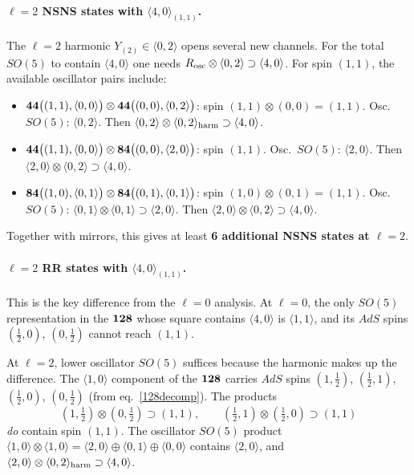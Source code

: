 \documentclass[12pt]{article}
\def\be{\begin{equation}}
\def\ee{\end{equation}}
\begin{document}
\paragraph{$\ell=2$ NSNS states with $\langle 4,0\rangle_{(1,1)}$.}
The $\ell=2$ harmonic $Y_{(2)}\in\langle 0,2\rangle$ opens several new channels.
For the total $SO(5)$ to contain $\langle 4,0\rangle$ one needs
$R_{\rm osc}\otimes\langle 0,2\rangle\supset\langle 4,0\rangle$.
For spin $(1,1)$, the available oscillator pairs include:
\begin{itemize}
\item ${\bf 44}\big((1,1),\langle 0,0\rangle\big)\otimes{\bf 44}\big((0,0),\langle 0,2\rangle\big)$:
spin $(1,1)\otimes(0,0)=(1,1)$. Osc.\ $SO(5)$: $\langle 0,2\rangle$.
Then $\langle 0,2\rangle\otimes\langle 0,2\rangle_{\rm harm}\supset\langle 4,0\rangle$. \checkmark
\item ${\bf 44}\big((1,1),\langle 0,0\rangle\big)\otimes{\bf 84}\big((0,0),\langle 2,0\rangle\big)$:
spin $(1,1)$. Osc.\ $SO(5)$: $\langle 2,0\rangle$.
Then $\langle 2,0\rangle\otimes\langle 0,2\rangle\supset\langle 4,0\rangle$. \checkmark
\item ${\bf 84}\big((1,0),\langle 0,1\rangle\big)\otimes{\bf 84}\big((0,1),\langle 0,1\rangle\big)$:
spin $(1,0)\otimes(0,1)=(1,1)$. Osc.\ $SO(5)$:
$\langle 0,1\rangle\otimes\langle 0,1\rangle\supset\langle 2,0\rangle$.
Then $\langle 2,0\rangle\otimes\langle 0,2\rangle\supset\langle 4,0\rangle$. \checkmark
\end{itemize}
Together with mirrors, this gives at least \textbf{6 additional NSNS states at $\ell=2$}.

\paragraph{$\ell=2$ RR states with $\langle 4,0\rangle_{(1,1)}$.}
This is the key difference from the $\ell=0$ analysis.
At $\ell=0$, the only $SO(5)$ representation in the ${\bf 128}$ whose square contains
$\langle 4,0\rangle$ is $\langle 1,1\rangle$, and its $AdS$ spins
$(\tfrac12,0)$, $(0,\tfrac12)$ cannot reach $(1,1)$.

At $\ell=2$, lower oscillator $SO(5)$ suffices because the harmonic makes up the difference.
The $\langle 1,0\rangle$ component of the ${\bf 128}$ carries $AdS$ spins
$(1,\tfrac12)$, $(\tfrac12,1)$, $(\tfrac12,0)$, $(0,\tfrac12)$
(from eq.~\eqref{128decomp}). The products
\be
(1,\tfrac12)\otimes(0,\tfrac12)
\supset(1,1),
\qquad
(\tfrac12,1)\otimes(\tfrac12,0)
\supset(1,1)
\ee
\emph{do} contain spin $(1,1)$.
The oscillator $SO(5)$ product $\langle 1,0\rangle\otimes\langle 1,0\rangle
=\langle 2,0\rangle\oplus\langle 0,1\rangle\oplus\langle 0,0\rangle$
contains $\langle 2,0\rangle$, and
$\langle 2,0\rangle\otimes\langle 0,2\rangle_{\rm harm}\supset\langle 4,0\rangle$.
\end{document}
